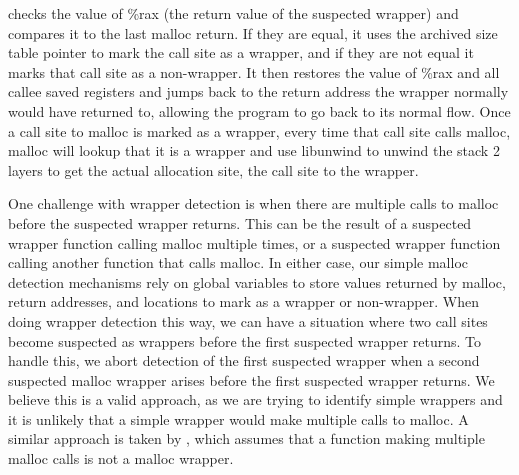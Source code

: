 \documentclass[conference]{IEEEtran}
\begin{document}
checks the value of \%rax (the return value of the suspected wrapper) and compares 
it to the last malloc return. If they are equal, it uses the archived size table 
pointer to mark the call site as a wrapper, and if they are not equal it marks that 
call site as a non-wrapper. It then restores the value of \%rax and all callee saved 
registers and jumps back to the return address the wrapper normally would have 
returned to, allowing the program to go back to its normal flow. Once a call site to 
malloc is marked as a wrapper, every time that call site calls malloc, malloc will 
lookup that it is a wrapper and use libunwind to unwind the stack 2 layers to get the 
actual allocation site, the call site to the wrapper.

One challenge with wrapper detection is when there are multiple calls to malloc before 
the suspected wrapper returns. This can be the result of a suspected wrapper function 
calling malloc multiple times, or a suspected wrapper function calling another function 
that calls malloc. In either case, our simple malloc detection mechanisms rely on 
global variables to store values returned by malloc, return addresses, and locations to 
mark as a wrapper or non-wrapper. When doing wrapper detection this way, we can have a 
situation where two call sites become suspected as wrappers before the first suspected 
wrapper returns. To handle this, we abort detection of the first suspected wrapper when 
a second suspected malloc wrapper arises before the first suspected wrapper returns. We 
believe this is a valid approach, as we are trying to identify simple wrappers and it 
is unlikely that a simple wrapper would make multiple calls to malloc. A similar 
approach is taken by \cite{b1}, which assumes that a function making multiple malloc 
calls is not a malloc wrapper.
\end{document}
